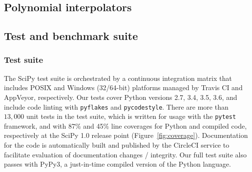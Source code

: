 \documentclass[fleqn,10pt]{wlscirep}
\begin{document}
\subsection*{Polynomial interpolators}



\subsection*{Test and benchmark suite}

\subsubsection*{Test suite}

The SciPy test suite is orchestrated by a continuous integration matrix that
includes POSIX and Windows (32/64-bit) platforms managed by Travis CI and
AppVeyor, respectively. Our tests cover Python versions 2.7, 3.4, 3.5, 3.6, and
include code linting with \texttt{pyflakes} and \texttt{pycodestyle}. There are more than $13,000$
unit tests in the test suite, which is written for usage with the \texttt{pytest}
framework, and with 87\% and 45\% line coverages for Python and compiled
code, respectively at the SciPy 1.0 release point (Figure~\ref{fig:coverage}). Documentation for the code is automatically built and published by
the CircleCI service to facilitate evaluation of documentation changes /
integrity.  Our full test suite also passes with PyPy3\cite{Bolz:2009:TMP:1565824.1565827}, a just-in-time compiled
version of the Python language.
\end{document}
